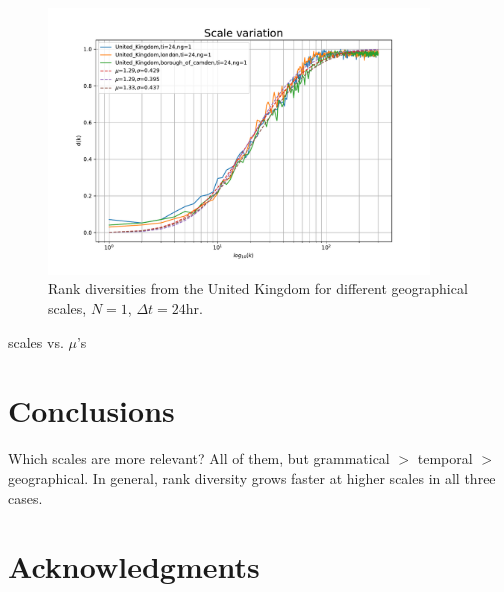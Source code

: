 \documentclass[12pt]{article}
\begin{document}
\begin{figure}[htbp]
\begin{center}
\includegraphics[width=0.9\textwidth]{img/geo-uk-24hrs}
\caption{Rank diversities from the United Kingdom for different geographical scales, $N = 1$, $\Delta t = 24$hr.}
\label{fig:geo-uk-24hrs}
\end{center}
\end{figure}





scales vs. $\mu$'s

\section{Conclusions}


Which scales are more relevant? All of them, but grammatical $>$ temporal $>$ geographical.
In general, rank diversity grows faster at higher scales in all three cases.

\section*{Acknowledgments}




\end{document}

